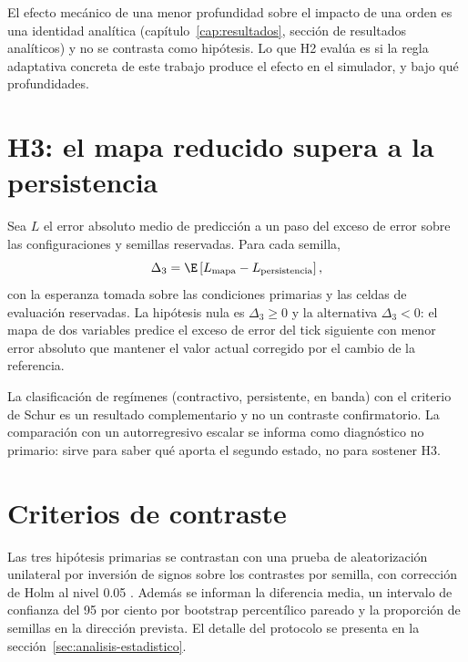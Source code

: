 El efecto mecánico de una menor profundidad sobre el impacto de una orden es una identidad analítica (capítulo~\ref{cap:resultados}, sección de resultados analíticos) y no se contrasta como hipótesis. Lo que H2 evalúa es si la regla adaptativa concreta de este trabajo produce el efecto en el simulador, y bajo qué profundidades.

\section{H3: el mapa reducido supera a la persistencia}

Sea $L$ el error absoluto medio de predicción a un paso del exceso de error sobre las configuraciones y semillas reservadas. Para cada semilla,
\[
\Delta_3 = \E\left[L_{\text{mapa}} - L_{\text{persistencia}}\right],
\]
con la esperanza tomada sobre las condiciones primarias y las celdas de evaluación reservadas. La hipótesis nula es $\Delta_3\ge 0$ y la alternativa $\Delta_3<0$: el mapa de dos variables predice el exceso de error del tick siguiente con menor error absoluto que mantener el valor actual corregido por el cambio de la referencia.

La clasificación de regímenes (contractivo, persistente, en banda) con el criterio de Schur es un resultado complementario y no un contraste confirmatorio. La comparación con un autorregresivo escalar se informa como diagnóstico no primario: sirve para saber qué aporta el segundo estado, no para sostener H3.

\section{Criterios de contraste}

Las tres hipótesis primarias se contrastan con una prueba de aleatorización unilateral por inversión de signos sobre los contrastes por semilla, con corrección de Holm al nivel 0.05 \cite{holm1979simple}. Además se informan la diferencia media, un intervalo de confianza del 95 por ciento por bootstrap percentílico pareado \cite{efron1979bootstrap} y la proporción de semillas en la dirección prevista. El detalle del protocolo se presenta en la sección~\ref{sec:analisis-estadistico}.
